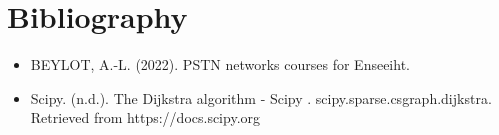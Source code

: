 \documentclass[lettersize,journal]{IEEEtran} %
\begin{document}
\section{Bibliography}
\begin{itemize}
        \item BEYLOT, A.-L. (2022). PSTN networks courses for Enseeiht. 
        \item Scipy. (n.d.). The Dijkstra algorithm - Scipy . scipy.sparse.csgraph.dijkstra.
        Retrieved from https://docs.scipy.org
\end{itemize}
\end{document}
